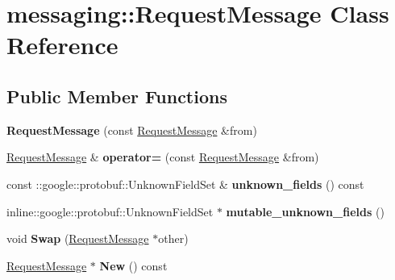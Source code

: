 \hypertarget{classmessaging_1_1RequestMessage}{
\section{messaging::RequestMessage Class Reference}
\label{classmessaging_1_1RequestMessage}
}
\subsection*{Public Member Functions}
\begin{DoxyCompactItemize}
\item 
\hypertarget{classmessaging_1_1RequestMessage_a186291ebfb46715c9d915358a2ebb0e1}{
{\bfseries RequestMessage} (const \hyperlink{classmessaging_1_1RequestMessage}{RequestMessage} \&from)}
\label{classmessaging_1_1RequestMessage_a186291ebfb46715c9d915358a2ebb0e1}

\item 
\hypertarget{classmessaging_1_1RequestMessage_a23d7d6bcd46afd140ba1fad40d1bb62c}{
\hyperlink{classmessaging_1_1RequestMessage}{RequestMessage} \& {\bfseries operator=} (const \hyperlink{classmessaging_1_1RequestMessage}{RequestMessage} \&from)}
\label{classmessaging_1_1RequestMessage_a23d7d6bcd46afd140ba1fad40d1bb62c}

\item 
\hypertarget{classmessaging_1_1RequestMessage_a0919fbd2ccc35add6614ab7e60c0b9a5}{
const ::google::protobuf::UnknownFieldSet \& {\bfseries unknown\_\-fields} () const }
\label{classmessaging_1_1RequestMessage_a0919fbd2ccc35add6614ab7e60c0b9a5}

\item 
\hypertarget{classmessaging_1_1RequestMessage_a7a975a8941e7907f8801320e5f452f86}{
inline::google::protobuf::UnknownFieldSet $\ast$ {\bfseries mutable\_\-unknown\_\-fields} ()}
\label{classmessaging_1_1RequestMessage_a7a975a8941e7907f8801320e5f452f86}

\item 
\hypertarget{classmessaging_1_1RequestMessage_ab6249d7c52bdcb6509821dc40684dd63}{
void {\bfseries Swap} (\hyperlink{classmessaging_1_1RequestMessage}{RequestMessage} $\ast$other)}
\label{classmessaging_1_1RequestMessage_ab6249d7c52bdcb6509821dc40684dd63}

\item 
\hypertarget{classmessaging_1_1RequestMessage_a25255a09eb7941dd1fea92c9db3bc738}{
\hyperlink{classmessaging_1_1RequestMessage}{RequestMessage} $\ast$ {\bfseries New} () const }
\label{classmessaging_1_1RequestMessage_a25255a09eb7941dd1fea92c9db3bc738}


\end{DoxyCompactItemize}
